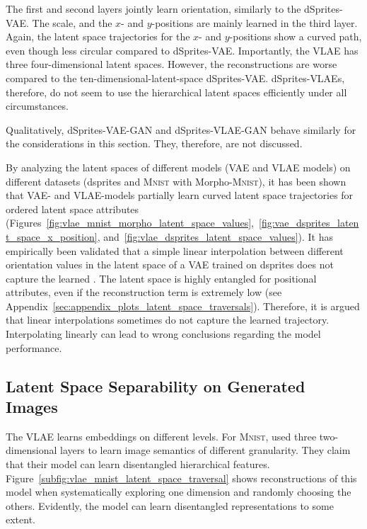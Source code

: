 The first and second layers jointly learn orientation, similarly to the dSprites-\ac{VAE}.
The scale, and the $x$- and $y$-positions are mainly learned in the third layer.
Again, the latent space trajectories for the $x$- and $y$-positions show a curved path, even though less circular compared to dSprites-\ac{VAE}.
Importantly, the \ac{VLAE} has three four-dimensional latent spaces.
However, the reconstructions are worse compared to the ten-dimensional-latent-space dSprites-\ac{VAE}.
dSprites-\acp{VLAE}, therefore, do not seem to use the hierarchical latent spaces efficiently under all circumstances.

Qualitatively, dSprites-\ac{VAE}-\ac{GAN} and dSprites-\ac{VLAE}-\ac{GAN} behave similarly for the considerations in this section.
They, therefore, are not discussed.

By analyzing the latent spaces of different models (\ac{VAE} and \ac{VLAE} models) on different datasets (dsprites and \textsc{Mnist} with Morpho-\textsc{Mnist}), it has been shown that \ac{VAE}- and \ac{VLAE}-models partially learn curved latent space trajectories for ordered latent space attributes (Figures~\ref{fig:vlae_mnist_morpho_latent_space_values},~\ref{fig:vae_dsprites_latent_space_x_position}, and~\ref{fig:vlae_dsprites_latent_space_values}).
It has empirically been validated that a simple linear interpolation between different orientation values in the latent space of a \ac{VAE} trained on dsprites does not capture the learned .
The latent space is highly entangled for positional attributes, even if the reconstruction term is extremely low (see Appendix~\ref{sec:appendix_plots_latent_space_traversals}).
Therefore, it is argued that linear interpolations sometimes do not capture the learned trajectory.
Interpolating linearly can lead to wrong conclusions regarding the model performance.


\subsection{Latent Space Separability on Generated Images}\label{subsec:independence-of-vlae-embeddings}

The VLAE learns embeddings on different levels.
For \textsc{Mnist}, \citet{zhao2017learning} used three two-dimensional layers to learn image semantics of different granularity.
They claim that their model can learn disentangled hierarchical features.
Figure~\ref{subfig:vlae_mnist_latent_space_traversal} shows reconstructions of this model when systematically exploring one dimension and randomly choosing the others.
Evidently, the model can learn disentangled representations to some extent.

